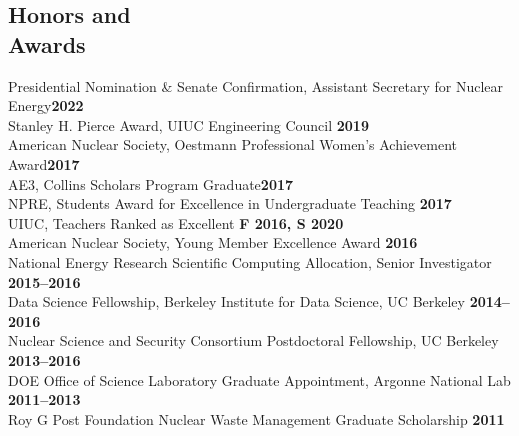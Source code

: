 \documentclass[margin,line]{resume}
\begin{document}
\begin{resume}
    \section{\mysidestyle Honors and\\Awards}
                Presidential Nomination \& Senate Confirmation, Assistant Secretary for Nuclear Energy\hfill \textbf{2022}\vspace{.5mm}\\%
                Stanley H. Pierce Award, UIUC Engineering Council \hfill \textbf{2019}\vspace{.5mm}\\%
                American Nuclear Society, Oestmann Professional Women's Achievement Award\hfill \textbf{2017}\vspace{.5mm}\\%
                AE3, Collins Scholars Program Graduate\hfill \textbf{2017}\vspace{.5mm}\\%
                NPRE, Students Award for Excellence in Undergraduate Teaching \hfill \textbf{2017}\vspace{.5mm}\\%
                UIUC, Teachers Ranked as Excellent \hfill \textbf{F 2016, S 2020}\vspace{.5mm}\\%
                American Nuclear Society, Young Member Excellence Award                         \hfill \textbf{2016}\vspace{.5mm}\\%
                National Energy Research Scientific Computing Allocation, Senior Investigator     \hfill \textbf{2015--2016}\vspace{.5mm}\\%
                Data Science Fellowship, Berkeley Institute for Data Science, UC Berkeley     \hfill \textbf{2014--2016}\vspace{.5mm}\\%
                Nuclear Science and Security Consortium Postdoctoral Fellowship, UC Berkeley  \hfill \textbf{2013--2016}\vspace{.5mm}\\%
                DOE Office of Science Laboratory Graduate Appointment, Argonne National Lab   \hfill \textbf{2011--2013}\vspace{.5mm}\\%
                Roy G  Post Foundation Nuclear Waste Management Graduate Scholarship                \hfill \textbf{2011}\vspace{.5mm}\\%

\end{resume}
\end{document}
